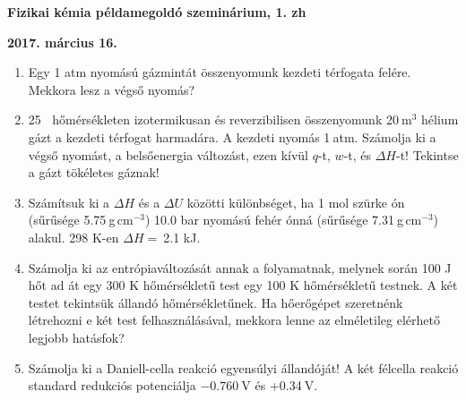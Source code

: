 \documentclass[a4paper, 11pt]{article}
\begin{document}
\textbf{Fizikai kémia példamegoldó szeminárium, 1. zh}

\textbf{2017. március 16.}
\thispagestyle{empty}

\begin{enumerate}

\item Egy 1 atm nyomású gázmintát összenyomunk kezdeti térfogata felére. Mekkora lesz a végső nyomás?

\item 25 \celsius$~$ hőmérsékleten izotermikusan és reverzibilisen összenyomunk 20$~$m$^3$ hélium gázt a kezdeti térfogat harmadára. A kezdeti nyomás 1$~$atm. Számolja ki a végső nyomást, a belsőenergia változást, ezen kívül $q$-t, $w$-t, és $\Delta H$-t! Tekintse a gázt tökéletes gáznak!

\item Számítsuk ki a $\Delta H$ és a $\Delta U$ közötti különbséget, ha 1 mol szürke ón (sűrűsége 5.75$~$g$\,$cm$^{-3}$) 10.0 bar nyomású fehér ónná (sűrűsége 7.31$~$g$\,$cm$^{-3}$) alakul. 298 K-en $\Delta H=~$2.1 kJ.

\item Számolja ki az entrópiaváltozását annak a folyamatnak, melynek során 100 J hőt ad át egy 300 K hőmérsékletű test egy 100 K hőmérsékletű testnek. A két testet tekintsük állandó hőmérsékletűnek. Ha hőerőgépet szeretnénk létrehozni e két test felhasználásával, mekkora lenne az elméletileg elérhető legjobb hatásfok?

\item Számolja ki a Daniell-cella reakció egyensúlyi állandóját! A két félcella reakció standard redukciós potenciálja $-0.760~$V és +0.34$~$V.

\end{enumerate}
\end{document}
